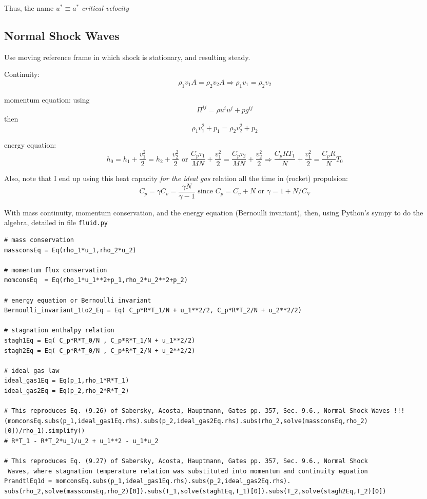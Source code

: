\documentclass[twoside,landscape,10pt]{amsart}
\theoremstyle{plain}
\theoremstyle{definition}
\theoremstyle{remark}
\theoremstyle{remark}
\begin{document}
\begin{multicols*}{2}
Thus, the name $u^*\equiv a^*$ \emph{critical velocity}

\subsection{Normal Shock Waves}

Use moving reference frame in which shock is stationary, and resulting steady.




Continuity:
\[
\rho_1 v_1 A = \rho_2 v_2 A \Longrightarrow \rho_1 v_1 = \rho_2 v_2 
\]

momentum equation: using
\[
\Pi^{ij} = \rho u^i u^j + p g^{ij}
\]
then
\[
\rho_1 v_1^2 + p_1 = \rho_2 v_2^2 + p_2 
\]

energy equation:
\[
h_0 = h_1 + \frac{v_1^2}{2} = h_2 + \frac{v_2^2}{2} \text{ or } \frac{C_p \tau_1}{MN} + \frac{v_1^2}{2} = \frac{C_p\tau_2}{MN} + \frac{v_2^2}{2} \Longrightarrow \frac{C_p R T_1}{N} + \frac{v_1^2}{2} = \frac{C_pR}{N} T_0
\]

Also, note that I end up using this heat capacity \emph{ for the ideal gas } relation all the time in (rocket) propulsion:
\[
C_p = \gamma C_v = \frac{\gamma N}{\gamma -1}  \text{ since } C_p = C_v + N \text{ or } \gamma = 1 + N/C_V
\]

With mass continuity, momentum conservation, and the energy equation (Bernoulli invariant), then, using Python's sympy to do the algebra, detailed in file \verb|fluid.py|
\begin{lstlisting}
# mass conservation
massconsEq = Eq(rho_1*u_1,rho_2*u_2)

# momentum flux conservation
momconsEq  = Eq(rho_1*u_1**2+p_1,rho_2*u_2**2+p_2)

# energy equation or Bernoulli invariant
Bernoulli_invariant_1to2_Eq = Eq( C_p*R*T_1/N + u_1**2/2, C_p*R*T_2/N + u_2**2/2)

# stagnation enthalpy relation
stagh1Eq = Eq( C_p*R*T_0/N , C_p*R*T_1/N + u_1**2/2)
stagh2Eq = Eq( C_p*R*T_0/N , C_p*R*T_2/N + u_2**2/2)

# ideal gas law
ideal_gas1Eq = Eq(p_1,rho_1*R*T_1)
ideal_gas2Eq = Eq(p_2,rho_2*R*T_2)

# This reproduces Eq. (9.26) of Sabersky, Acosta, Hauptmann, Gates pp. 357, Sec. 9.6., Normal Shock Waves !!!
(momconsEq.subs(p_1,ideal_gas1Eq.rhs).subs(p_2,ideal_gas2Eq.rhs).subs(rho_2,solve(massconsEq,rho_2)[0])/rho_1).simplify()
# R*T_1 - R*T_2*u_1/u_2 + u_1**2 - u_1*u_2

# This reproduces Eq. (9.27) of Sabersky, Acosta, Hauptmann, Gates pp. 357, Sec. 9.6., Normal Shock
 Waves, where stagnation temperature relation was substituted into momentum and continuity equation
PrandtlEq1d = momconsEq.subs(p_1,ideal_gas1Eq.rhs).subs(p_2,ideal_gas2Eq.rhs).
subs(rho_2,solve(massconsEq,rho_2)[0]).subs(T_1,solve(stagh1Eq,T_1)[0]).subs(T_2,solve(stagh2Eq,T_2)[0])


\end{lstlisting}
\end{multicols*}
\end{document}
